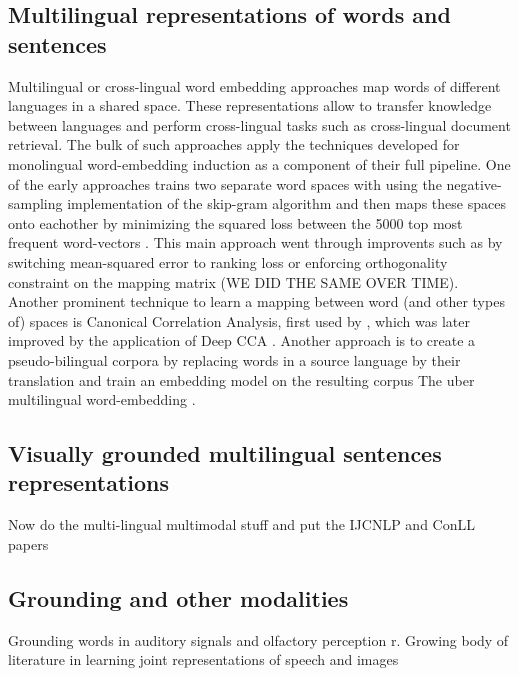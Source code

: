 \subsection{Multilingual representations of words and sentences}
Multilingual or cross-lingual word embedding approaches map words of different languages in a shared space. These representations allow to transfer knowledge between languages and
perform cross-lingual tasks such as cross-lingual document retrieval. The bulk of such approaches apply the techniques developed for monolingual word-embedding induction as a component
of their full pipeline. One of the early approaches trains two separate word spaces with using the negative-sampling implementation of the skip-gram algorithm and then maps these spaces onto eachother by minimizing the squared loss between the 5000 top most frequent word-vectors \cite{mikolov2013exploiting}. This main approach went through improvents
such as by switching mean-squared error to ranking loss \cite{lazaridou2015hubness} or enforcing orthogonality constraint on the mapping matrix
\cite{xing2015normalized}   (WE DID THE SAME OVER TIME). Another prominent technique to learn a mapping between word (and other types of) spaces is Canonical Correlation Analysis, first
used by \cite{faruqui2014improving}, which was later improved by the application of Deep CCA \cite{lu2015deep}. Another approach is to create a pseudo-bilingual corpora by replacing words
in a source language by their translation and train an embedding model on the resulting corpus
The uber multilingual word-embedding \cite{ammar2016massively}.

\subsection{Visually grounded multilingual sentences representations}
Now do the multi-lingual multimodal stuff and put the IJCNLP and ConLL papers

\subsection{Grounding and other modalities}
Grounding words in auditory signals \cite{kiela2015multi,lopopolo2015sound} and olfactory perception \cite{kiela2015grounding}r. Growing body of literature in learning joint representations of speech and images \cite{harwath2016unsupervised,chrupala2017representations,harwath2018jointly}


